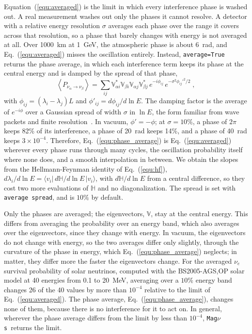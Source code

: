 \documentclass[final,5p,times,twocolumn,sort,compress]{elsarticle}
\makeatletter
\newcommand{\eq}{Eq.}
\DeclareRobustCommand{\_}{%
  \ifmmode\nfss@text{\textunderscore}\else\textunderscore\allowbreak\fi}
\newcommand{\equ}[1]{\eq~(\ref{equ:#1})}
\newcommand{\magnus}{{\tt Mag}\ensuremath{\nu}{\tt s}}
\makeatother
\begin{document}
Equation~(\ref{equ:averaged}) is the limit in which every interference phase is washed out. A real measurement washes out only the phases it cannot resolve. A detector with a relative energy resolution $\sigma$ averages each phase over the range it covers across that resolution, so a phase that barely changes with energy is not averaged at all. Over 1000~km at 1~GeV, the atmospheric phase is about 6~rad, and \equ{averaged} misses the oscillation entirely. Instead, {\tt average=True} returns the phase average, in which each interference term keeps its phase at the central energy and is damped by the spread of that phase,
\begin{equation}
 \label{equ:phase_average}
 \left\langle P_{\nu_\alpha \to \nu_\beta} \right\rangle
 =
 \sum_{ij} \mathbb{V}^\ast_{\alpha i}\mathbb{V}_{\beta i}\mathbb{V}_{\alpha j}\mathbb{V}^\ast_{\beta j}\,
 e^{-i\phi_{ij}}\, e^{-\sigma^2 \phi_{ij}'^2/2} \;,
\end{equation}
with $\phi_{ij} = (\lambda_i - \lambda_j)L$ and $\phi'_{ij} = d\phi_{ij}/d\ln E$. The damping factor is the average of $e^{-i\phi}$ over a Gaussian spread of width $\sigma$ in $\ln E$, the form familiar from wave packets and finite resolution\ \cite{Kiers:1995zj, Blennow:2005yk, Ohlsson:2000mj}. In vacuum, $\phi' = -\phi$; at $\sigma = 10\%$, a phase of $2\pi$ keeps 82\% of its interference, a phase of 20~rad keeps 14\%, and a phase of 40~rad keeps $3\times10^{-4}$. Therefore, \equ{phase_average} is \equ{averaged} wherever every phase runs through many cycles, the oscillation probability itself where none does, and a smooth interpolation in between. We obtain the slopes from the Hellmann-Feynman identity of \equ{hf}, $d\lambda_i/d\ln E = \langle v_i|\, d\mathbb{H}/d\ln E\, |v_i\rangle$, with $d\mathbb{H}/d\ln E$ from a central difference, so they cost two more evaluations of $\mathbb{H}$ and no diagonalization. The spread is set with {\tt average\_spread}, and is $10\%$ by default.

Only the phases are averaged; the eigenvectors, $\mathbb{V}$, stay at the central energy. This differs from averaging the probability over an energy band, which also averages over the eigenvectors, since they change with energy. In vacuum, the eigenvectors do not change with energy, so the two averages differ only slightly, through the curvature of the phase in energy, which \equ{phase_average} neglects; in matter, they differ more the faster the eigenvectors change. For the averaged $\nu_e$ survival probability of solar neutrinos, computed with the BS2005-AGS,OP solar model at 40 energies from 0.1 to 20~MeV, averaging over a $10\%$ energy band changes 26 of the 40 values by more than $10^{-4}$ relative to the limit of \equ{averaged}. The phase average, \equ{phase_average}, changes none of them, because there is no interference for it to act on. In general, wherever the phase average differs from the limit by less than $10^{-4}$, \magnus\ returns the limit.
\end{document}
